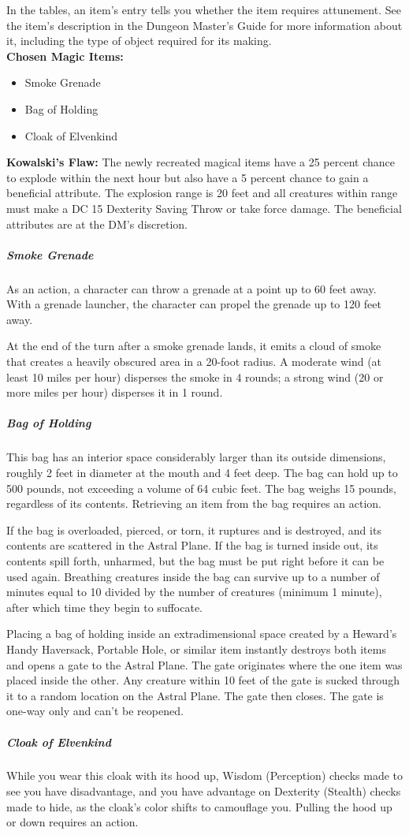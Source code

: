 {In the tables, an item's entry tells you whether the item requires attunement. See the item's description in the Dungeon Master's Guide for more information about it, including the type of object required for its making.\\
\textbf{Chosen Magic Items:}
\begin{itemize}
	\item Smoke Grenade
	\item Bag of Holding
	\item Cloak of Elvenkind
\end{itemize}
\textbf{Kowalski's Flaw:} The newly recreated magical items have a 25 percent chance to explode within the next hour but also have a 5 percent chance to gain a beneficial attribute. The explosion range is 20 feet and all creatures within range must make a DC 15 Dexterity Saving Throw or take  force damage. The beneficial attributes are at the DM's discretion.\\
\subparagraph*{Smoke Grenade}
As an action, a character can throw a grenade at a point up to 60 feet away. With a grenade launcher, the character can propel the grenade up to 120 feet away.

At the end of the turn after a smoke grenade lands, it emits a cloud of smoke that creates a heavily obscured area in a 20-foot radius. A moderate wind (at least 10 miles per hour) disperses the smoke in 4 rounds; a strong wind (20 or more miles per hour) disperses it in 1 round.\\
\subparagraph*{Bag of Holding}
This bag has an interior space considerably larger than its outside dimensions, roughly 2 feet in diameter at the mouth and 4 feet deep. The bag can hold up to 500 pounds, not exceeding a volume of 64 cubic feet. The bag weighs 15 pounds, regardless of its contents. Retrieving an item from the bag requires an action.

If the bag is overloaded, pierced, or torn, it ruptures and is destroyed, and its contents are scattered in the Astral Plane. If the bag is turned inside out, its contents spill forth, unharmed, but the bag must be put right before it can be used again. Breathing creatures inside the bag can survive up to a number of minutes equal to 10 divided by the number of creatures (minimum 1 minute), after which time they begin to suffocate.

Placing a bag of holding inside an extradimensional space created by a Heward's Handy Haversack, Portable Hole, or similar item instantly destroys both items and opens a gate to the Astral Plane. The gate originates where the one item was placed inside the other. Any creature within 10 feet of the gate is sucked through it to a random location on the Astral Plane. The gate then closes. The gate is one-way only and can't be reopened.\\
\subparagraph*{Cloak of Elvenkind}
While you wear this cloak with its hood up, Wisdom (Perception) checks made to see you have disadvantage, and you have advantage on Dexterity (Stealth) checks made to hide, as the cloak's color shifts to camouflage you. Pulling the hood up or down requires an action.
}
